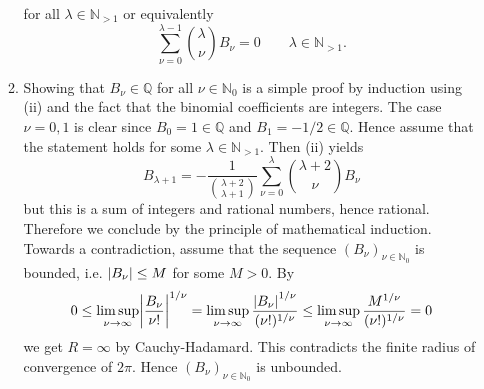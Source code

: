 \begin{enumerate}[label = \textbf{Exercise \arabic*.},wide = 0pt, itemsep=1.5ex]
\begin{enumerate}[label = (\roman*),wide = 0pt, itemsep=1.5ex]
			\noindent for all $\lambda \in \mathbb{N}_{>1}$ or equivalently
			\begin{equation}
				\boxed{\sum_{\nu = 0}^{\lambda - 1}{\lambda \choose \nu}B_\nu = 0 \qquad \lambda \in \mathbb{N}_{>1}.}
			\end{equation}

		\item Showing that $B_\nu \in \mathbb{Q}$ for all $\nu \in \mathbb{N}_0$ is a simple proof by induction using (ii) and the fact that the binomial coefficients are integers. The case $\nu = 0,1$ is clear since $B_0 = 1 \in \mathbb{Q}$ and $B_1 = -1/2 \in \mathbb{Q}$. Hence assume that the statement holds for some $\lambda \in \mathbb{N}_{>1}$. Then (ii) yields
			\begin{equation}
				B_{\lambda+1} = -\frac{1}{{\lambda + 2 \choose \lambda + 1}}\sum_{\nu = 0}^{\lambda}{\lambda + 2\choose \nu}B_\nu
			\end{equation}
			\noindent but this is a sum of integers and rational numbers, hence rational. Therefore we conclude by the principle of mathematical induction.\\
			Towards a contradiction, assume that the sequence $(B_\nu)_{\nu \in \mathbb{N}_0}$ is bounded, i.e. $\abs[0]{B_\nu} \leq M$ for some $M > 0$. By
			\begin{equation}
				0 \leq \limsup_{\nu \to \infty} \abs{\frac{B_\nu}{\nu!}}^{1/\nu} = \limsup_{\nu \to \infty}\frac{\abs[0]{B_\nu}^{1/\nu}}{(\nu !)^{1/\nu}} \leq \limsup_{\nu \to \infty} \frac{M^{1/\nu}}{(\nu !)^{1/\nu}} = 0
			\end{equation}
			\noindent we get $R = \infty$ by Cauchy-Hadamard. This contradicts the finite radius of convergence of $2\pi$. Hence $(B_\nu)_{\nu \in \mathbb{N}_0}$ is unbounded.
		\end{enumerate}
\end{enumerate}
\printbibliography

